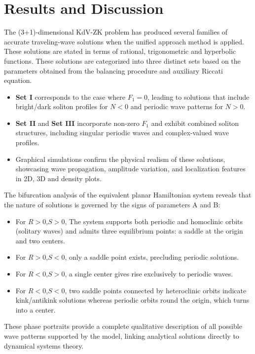 \documentclass{article}
\numberwithin{equation}{section}
\begin{document}
\section{Results and Discussion}\label{s4}
\noindent
The (3+1)-dimensional KdV-ZK problem has produced several families of accurate traveling-wave solutions when the unified approach method is applied. These solutions are stated in terms of rational, trigonometric and hyperbolic functions. These solutions are categorized into three distinct sets based on the parameters obtained from the balancing procedure and auxiliary Riccati equation.\\
\begin{itemize}
  \item \textbf{Set I} corresponds to the case where $F_{1}=0$, leading to solutions that include bright/dark soliton profiles for $N<0$ and periodic wave patterns for $N>0$.
  \item \textbf{Set II} and \textbf{Set III} incorporate non-zero $F_{1}$ and exhibit combined soliton structures, including singular periodic waves and complex-valued wave profiles.
  \item Graphical simulations confirm the physical realism of these solutions, showcasing wave propagation, amplitude variation, and localization features in 2D, 3D and density plots.
\end{itemize}

The bifurcation analysis of the equivalent planar Hamiltonian system reveals that the nature of solutions is governed by the signs of parameters A and B:
\begin{itemize}
  \item For $R>0$,$S>0$, The system supports both periodic and homoclinic orbits (solitary waves) and admits three equilibrium points: a saddle at the origin and two centers.
  \item For $R>0$,$S<0$, only a saddle point exists, precluding periodic solutions.
  \item For $R<0$,$S>0$, a single center gives rise exclusively to periodic waves.
  \item For $R<0$,$S<0$, two saddle points connected by heteroclinic orbits indicate kink/antikink solutions whereas periodic orbits round the origin, which turns into a center.
\end{itemize}
These phase portraits provide a complete qualitative description of all possible wave patterns supported by the model, linking analytical solutions directly to dynamical systems theory.
\end{document}
